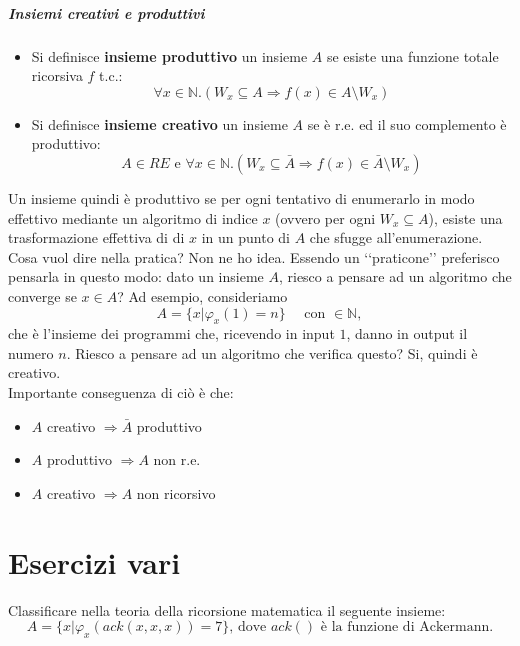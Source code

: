 \documentclass[a4paper,oneside]{scrbook}
\begin{document}
\paragraph{Insiemi creativi e produttivi}
\begin{itemize}
	\item Si definisce \textbf{insieme produttivo} un insieme $A$ se esiste una funzione totale ricorsiva $f$ t.c.:
	\begin{equation*}
		\forall x\in\mathbb{N}. (W_x \subseteq A \Rightarrow f(x)\in A \setminus W_x)
	\end{equation*}
	\item Si definisce \textbf{insieme creativo} un insieme $A$ se è r.e. ed il suo complemento è produttivo:
	\begin{equation*}
		A \in RE \text{ e } \forall x \in \mathbb{N}. (W_x \subseteq \bar{A} \Rightarrow f(x)\in\bar{A}\setminus W_x)
	\end{equation*}
\end{itemize}
Un insieme quindi è produttivo se per ogni tentativo di enumerarlo in modo effettivo mediante un algoritmo di indice $x$ (ovvero per ogni $W_x \subseteq A$),
esiste una trasformazione effettiva di di $x$ in un punto di $A$ che sfugge all'enumerazione. Cosa vuol dire nella pratica? Non ne ho idea.
Essendo un ‘‘praticone’’ preferisco pensarla in questo modo: dato un insieme $A$, riesco a pensare ad un algoritmo che converge se $x\in A$?
Ad esempio, consideriamo
$$A=\{x|\varphi_x(1)=n\} \quad \text{ con } \in\mathbb{N},$$
che è l'insieme dei programmi che, ricevendo in input $1$, danno in output il numero $n$. Riesco a pensare ad un algoritmo che verifica questo?
Si, quindi è creativo.\\
Importante conseguenza di ciò è che:
\begin{itemize}
	\item $A$ creativo $\Rightarrow \bar{A}$ produttivo
	\item $A$ produttivo $\Rightarrow A$ non r.e.
	\item $A$ creativo $\Rightarrow A$ non ricorsivo
\end{itemize}

\chapter{Esercizi vari}
Classificare nella teoria della ricorsione matematica il seguente insieme:
\begin{equation*}
	A=\{x|\varphi_x(ack(x,x,x))=7\} \text{, dove $ack()$ è la funzione di Ackermann.}
\end{equation*}
\end{document}
